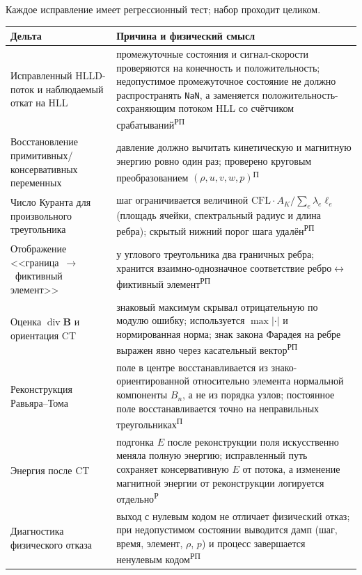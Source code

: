 \documentclass[12pt,a4paper]{article}
\newcommand{\divg}{\operatorname{div}}
\newcommand{\B}{\mathbf{B}}
\newcommand{\code}[1]{\texttt{#1}}
\newcommand{\Rl}{\textsuperscript{\scriptsize Р}}   %
\newcommand{\Pv}{\textsuperscript{\scriptsize П}}   %
\begin{document}
Каждое исправление имеет регрессионный тест; набор проходит целиком.

\begin{center}\footnotesize
\begin{tabular}{p{4.6cm}p{10.4cm}}
\toprule
Дельта & Причина и физический смысл \\
\midrule
Исправленный HLLD-поток и наблюдаемый откат на HLL & промежуточные состояния и
сигнал-скорости проверяются на конечность и положительность; недопустимое
промежуточное состояние не должно распространять \code{NaN}, а заменяется
положительность-сохраняющим потоком HLL со счётчиком срабатываний\Rl\Pv \\
Восстановление примитивных/консервативных переменных & давление должно вычитать
кинетическую и магнитную энергию ровно один раз; проверено круговым
преобразованием $(\rho,u,v,w,p)$\Pv \\
Число Куранта для произвольного треугольника & шаг ограничивается величиной
$\mathrm{CFL}\cdot A_K/\sum_e \lambda_e \ell_e$ (площадь ячейки, спектральный
радиус и длина ребра); скрытый нижний порог шага удалён\Rl\Pv \\
Отображение <<граница~$\to$~фиктивный элемент>> & у углового треугольника два
граничных ребра; хранится взаимно-однозначное соответствие
ребро$\leftrightarrow$фиктивный элемент\Rl\Pv \\
Оценка $\divg\B$ и ориентация CT & знаковый максимум скрывал отрицательную по
модулю ошибку; используется $\max|\cdot|$ и нормированная норма; знак закона
Фарадея на ребре выражен явно через касательный вектор\Rl\Pv \\
Реконструкция Равьяра--Тома & поле в центре восстанавливается из
знако-ориентированной относительно элемента нормальной компоненты $B_n$, а не
из порядка узлов; постоянное поле восстанавливается точно на неправильных
треугольниках\Pv \\
Энергия после CT & подгонка $E$ после реконструкции поля искусственно меняла
полную энергию; исправленный путь сохраняет консервативную $E$ от потока, а
изменение магнитной энергии от реконструкции логируется отдельно\Rl \\
Диагностика физического отказа & выход с нулевым кодом не отличает физический
отказ; при недопустимом состоянии выводится дамп (шаг, время, элемент,
$\rho$, $p$) и процесс завершается ненулевым кодом\Rl\Pv \\
\bottomrule
\end{tabular}
\end{center}
\end{document}
